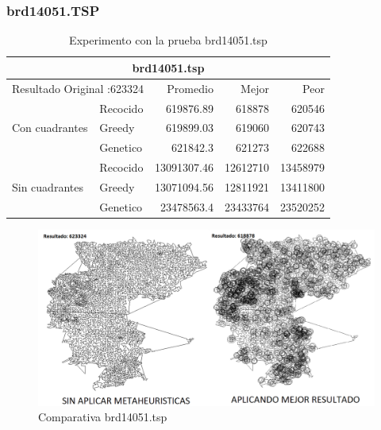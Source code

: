 \subsubsection{brd14051.TSP}
\begin{table}[hbtp]
 \centering 
	\begin{tabular}{ | l   l | r | r | r |   }
        \hline\multicolumn{5}{|c|}{ \rowcolor[gray]{0.8}brd14051.tsp  } \\\hline
        \multicolumn{2}{|l|}{Resultado Original :623324}  & Promedio & Mejor & Peor \\ \hline
                        & Recocido  & 619876.89 & 618878 & 620546  \\ 
         Con cuadrantes & Greedy    & 619899.03 & 619060 & 620743  \\ 
                        & Genetico  & 621842.3 & 621273 & 622688  \\ \hline
                        & Recocido  & 13091307.46 & 12612710 & 13458979   \\ 
         Sin cuadrantes & Greedy    & 13071094.56 & 12811921 & 13411800   \\ 
                        & Genetico  & 23478563.4 & 23433764 & 23520252   \\ \hline
    \end{tabular}
    \caption{Experimento con la prueba brd14051.tsp}
    \label{table:EXP_brd14051.tsp}
\end{table}
\begin{figure}[hbtp]
    \centering
        \includegraphics[width=1\textwidth]{PruebasResultados/Experimentos_Comparativas/brd14051.png}
        \caption{Comparativa brd14051.tsp}
        \label{fig:brd14051_comparativa.png}
\end{figure}
